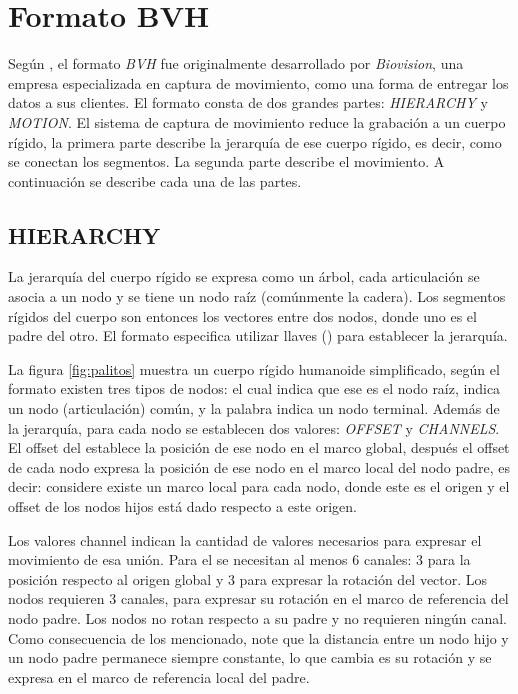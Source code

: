 \chapter{Formato BVH}

Según \cite{wisconsin-bvh}, el formato \emph{BVH} fue originalmente desarrollado por \emph{Biovision}, una empresa especializada en captura de movimiento, como una forma de entregar los datos a sus clientes. El formato consta de dos grandes partes: \emph{HIERARCHY} y \emph{MOTION}. El sistema de captura de movimiento reduce la grabación a un cuerpo rígido, la primera parte describe la jerarquía de ese cuerpo rígido, es decir, como se conectan los segmentos. La segunda parte describe el movimiento. A continuación se describe cada una de las partes.

\section{HIERARCHY}

La jerarquía del cuerpo rígido se expresa como un árbol, cada articulación se asocia a un nodo y se tiene un nodo raíz (comúnmente la cadera). Los segmentos rígidos del cuerpo son entonces los vectores entre dos nodos, donde uno es el padre del otro. El formato especifica utilizar llaves (\mono{\{\}}) para establecer la jerarquía. 

La figura \ref{fig:palitos} muestra un cuerpo rígido humanoide simplificado, según el formato existen tres tipos de nodos:  el cual indica que ese es el nodo raíz,  indica un nodo (articulación) común, y la palabra  indica un nodo terminal. Además de la jerarquía, para cada nodo se establecen dos valores: \emph{OFFSET} y \emph{CHANNELS}. El offset del  establece la posición de ese nodo en el marco global, después el offset de cada nodo expresa la posición de ese nodo en el marco local del nodo padre, es decir: considere existe un marco local para cada nodo, donde este es el origen y el offset de los nodos hijos está dado respecto a este origen. 

Los valores channel indican la cantidad de valores necesarios para expresar el movimiento de esa unión. Para el  se necesitan al menos 6 canales: 3 para la posición respecto al origen global y 3 para expresar la rotación del vector. Los nodos  requieren 3 canales, para expresar su rotación en el marco de referencia del nodo padre. Los nodos  no rotan respecto a su padre y no requieren ningún canal. Como consecuencia de los mencionado, note que la distancia entre un nodo hijo y un nodo padre permanece siempre constante, lo que cambia es su rotación y se expresa en el marco de referencia local del padre. 

